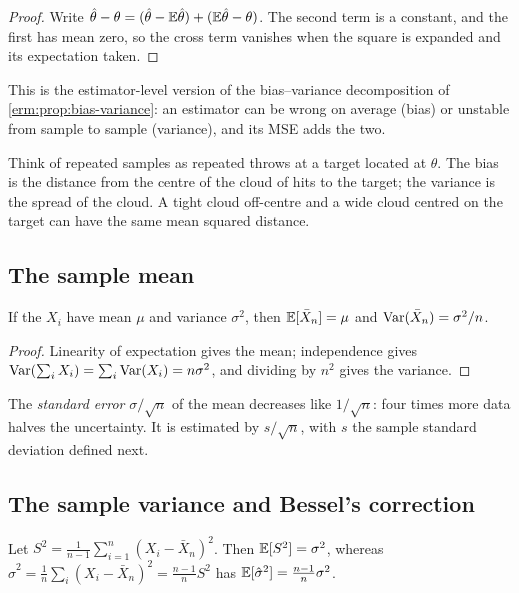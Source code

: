 \begin{notechapter}
\begin{proof}
Write $\hat\theta - \theta = (\hat\theta - \mathbb{E}\hat\theta) + (\mathbb{E}\hat\theta - \theta)$.
The second term is a constant, and the first has mean zero, so the cross term
vanishes when the square is expanded and its expectation taken.
\end{proof}

This is the estimator-level version of the bias--variance decomposition of
\cref{erm:prop:bias-variance}: an estimator can be wrong on average (bias) or
unstable from sample to sample (variance), and its MSE adds the two.

\begin{intuition}[Darts]
Think of repeated samples as repeated throws at a target located at $\theta$.
The bias is the distance from the centre of the cloud of hits to the target;
the variance is the spread of the cloud. A tight cloud off-centre and a wide
cloud centred on the target can have the same mean squared distance.
\end{intuition}

\subsection{The sample mean}

\begin{proposition}\label{stats-and-proba:prop:mean}
If the $X_i$ have mean $\mu$ and variance $\sigma^2$, then
$\mathbb{E}[\bar X_n] = \mu$ and $\operatorname{Var}(\bar X_n) = \sigma^2/n$.
\end{proposition}

\begin{proof}
Linearity of expectation gives the mean; independence gives
$\operatorname{Var}(\sum_iX_i) = \sum_i\operatorname{Var}(X_i) = n\sigma^2$, and dividing by $n^2$ gives the
variance.
\end{proof}

The \emph{standard error} $\sigma/\sqrt n$ of the mean decreases like $1/\sqrt n$:
four times more data halves the uncertainty. It is estimated by $s/\sqrt n$,
with $s$ the sample standard deviation defined next.

\subsection{The sample variance and Bessel's correction}

\begin{proposition}\label{stats-and-proba:prop:bessel}
Let $S^2 = \frac1{n-1}\sum_{i=1}^n(X_i - \bar X_n)^2$. Then $\mathbb{E}[S^2] = \sigma^2$,
whereas $\hat\sigma^2 = \frac1n\sum_i(X_i - \bar X_n)^2 = \frac{n-1}{n}S^2$ has
$\mathbb{E}[\hat\sigma^2] = \frac{n-1}n\sigma^2$.
\end{proposition}


\end{notechapter}
